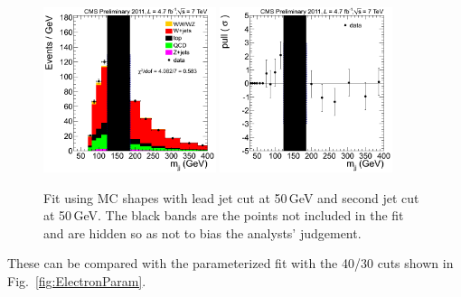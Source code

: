 \begin{figure}
\begin{center}
  \includegraphics[width=0.45\textwidth]{figs/ElectronCuts/hist50_Wjj_Mjj_Electron_2jets_Stacked.png}
  \includegraphics[width=0.45\textwidth]{figs/ElectronCuts/hist50_Wjj_Mjj_Electron_2jets_Pull.png}
\end{center}
\caption{\label{fig:Electron5050}Fit using MC shapes with lead jet cut at 50\,GeV and second jet cut at 50\,GeV.  The black bands are the points not included in the fit and are hidden so as not to bias the analysts' judgement.}
\end {figure}

These can be compared with the parameterized fit with the 40/30 cuts
shown in Fig.~\ref{fig:ElectronParam}.

